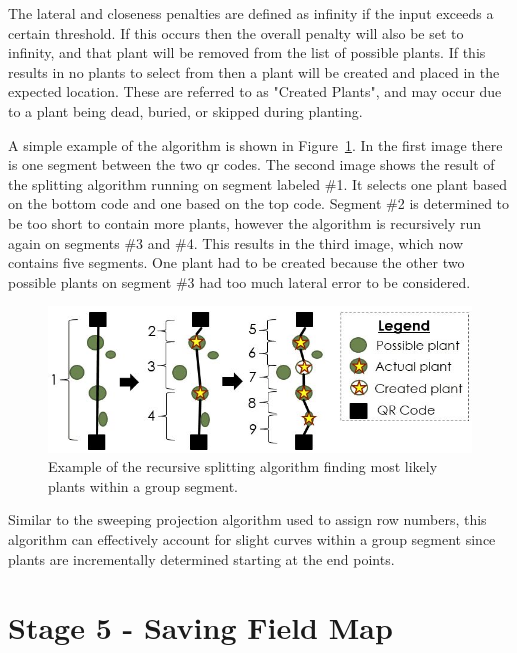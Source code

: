 The lateral and closeness penalties are defined as infinity if the input exceeds a certain threshold.  If this occurs then the overall penalty will also be set to infinity, and that plant will be removed from the list of possible plants.  If this results in no plants to select from then a plant will be created and placed in the expected location.  These are referred to as "Created Plants", and may occur due to a plant being dead, buried, or skipped during planting.  

A simple example of the algorithm is shown in Figure~\ref{figure:recursive_algorithm}.  In the first image there is one segment between the two \ac{qr} codes.  The second image shows the result of the splitting algorithm running on segment labeled \#1. It selects one plant based on the bottom code and one based on the top code.  Segment \#2 is determined to be too short to contain more plants, however the algorithm is recursively run again on segments \#3 and \#4.  This results in the third image, which now contains five segments.  One plant had to be created because the other two possible plants on segment \#3 had too much lateral error to be considered.   

\begin{figure}
	\centering
    \includegraphics[width=5in]{figures/recursive_algorithm2.jpg}
    \caption[Recursive splitting algorithm]{Example of the recursive splitting algorithm finding most likely plants within a group segment.}
    \label{figure:recursive_algorithm}
\end{figure}

Similar to the sweeping projection algorithm used to assign row numbers, this algorithm can effectively account for slight curves within a group segment since plants are incrementally determined starting at the end points. 

\section{Stage 5 - Saving Field Map}
\label{processing-stage5}

